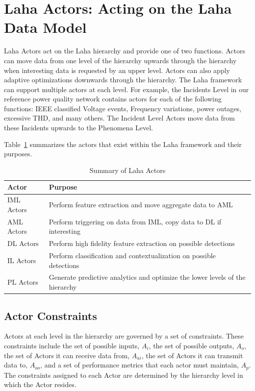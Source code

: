 \section{Laha Actors: Acting on the Laha Data Model}\label{sec:laha-actors:-acting-on-the-laha-data-model}
Laha Actors act on the Laha hierarchy and provide one of two functions. Actors can move data from one level of the hierarchy upwards through the hierarchy when interesting data is requested by an upper level. Actors can also apply adaptive optimizations downwards through the hierarchy. The Laha framework can support multiple actors at each level. For example, the Incidents Level in our reference power quality network contains actors for each of the following functions: IEEE classified Voltage events, Frequency variations, power outages, excessive THD, and many others. The Incident Level Actors move data from these Incidents upwards to the Phenomena Level.

Table~\ref{laha-actors-tables} summarizes the actors that exist within the Laha framework and their purposes.

\begin{table}[h]
	\centering
	\caption{Summary of Laha Actors}
	\begin{tabularx}{\textwidth}{lX}
		\toprule
		\textbf{Actor} & \textbf{Purpose} \\
		\midrule
		IML Actors & Perform feature extraction and move aggregate data to AML \\
		AML Actors & Perform triggering on data from IML, copy data to DL if interesting \\
		DL Actors & Perform high fidelity feature extraction on possible detections \\
		IL Actors & Perform classification and contextualization on possible detections \\
		PL Actors & Generate predictive analytics and optimize the lower levels of the hierarchy \\
		\bottomrule
	\end{tabularx}
	\label{laha-actors-tables}
\end{table}

\subsection{Actor Constraints}\label{subsec:actor-constraints}
Actors at each level in the hierarchy are governed by a set of constraints. These constraints include the set of possible inputs, $A_i$, the set of possible outputs, $A_o$, the set of Actors it can receive data from, $A_{ai}$, the set of Actors it can transmit data to, $A_{ao}$, and a set of performance metrics that each actor must maintain, $A_p$. The constraints assigned to each Actor are determined by the hierarchy level in which the Actor resides.


